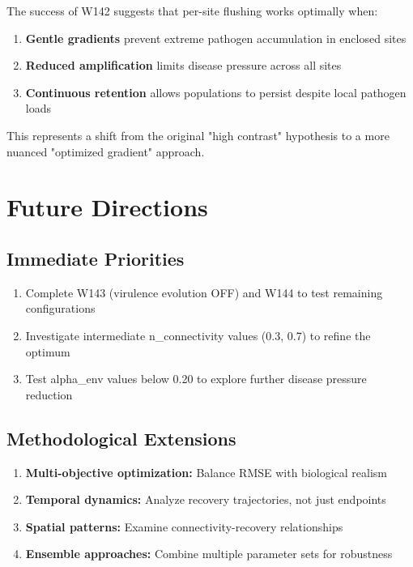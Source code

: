 \documentclass[11pt,letterpaper]{article}
\begin{document}
The success of W142 suggests that per-site flushing works optimally when:
\begin{enumerate}
\item \textbf{Gentle gradients} prevent extreme pathogen accumulation in enclosed sites
\item \textbf{Reduced amplification} limits disease pressure across all sites
\item \textbf{Continuous retention} allows populations to persist despite local pathogen loads
\end{enumerate}

This represents a shift from the original "high contrast" hypothesis to a more nuanced "optimized gradient" approach.

\section{Future Directions}

\subsection{Immediate Priorities}

\begin{enumerate}
\item Complete W143 (virulence evolution OFF) and W144 to test remaining configurations
\item Investigate intermediate n\_connectivity values (0.3, 0.7) to refine the optimum
\item Test alpha\_env values below 0.20 to explore further disease pressure reduction
\end{enumerate}

\subsection{Methodological Extensions}

\begin{enumerate}
\item \textbf{Multi-objective optimization:} Balance RMSE with biological realism
\item \textbf{Temporal dynamics:} Analyze recovery trajectories, not just endpoints
\item \textbf{Spatial patterns:} Examine connectivity-recovery relationships
\item \textbf{Ensemble approaches:} Combine multiple parameter sets for robustness
\end{enumerate}
\end{document}

